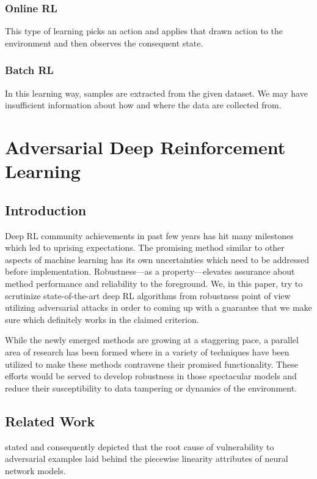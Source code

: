 \documentclass[letterpaper,12pt]{article}
\begin{document}
\subsubsection{Online RL}
This type of learning picks an action and applies that drawn action to the environment and then observes the consequent state.

\subsubsection{Batch RL}
In this learning way, samples are extracted from the given dataset. We may have insufficient information about how and where the data are collected from.


\section{Adversarial Deep Reinforcement Learning}

\subsection{Introduction}
Deep RL community achievements in past few years has hit many milestones which led to uprising expectations. The promising method similar to other aspects of machine learning has its own uncertainties which need to be addressed before implementation. Robustness---as a property---elevates assurance about method performance and reliability to the foreground. We, in this paper, try to scrutinize state-of-the-art deep RL algorithms from robustness point of view utilizing adversarial attacks in order to coming up with a guarantee that we make sure which definitely works in the claimed criterion.

While the newly emerged methods are growing at a staggering pace, a parallel area of research has been formed where in a variety of techniques have been utilized to make these methods contravene their promised functionality. These efforts would be served to develop robustness in those spectacular models and reduce their susceptibility to data tampering or dynamics of the environment.

\subsection{Related Work}
\citet{Goodfellow2014} stated and consequently depicted that the root cause of vulnerability to adversarial examples laid behind the piecewise linearity attributes of neural network models.
\end{document}
